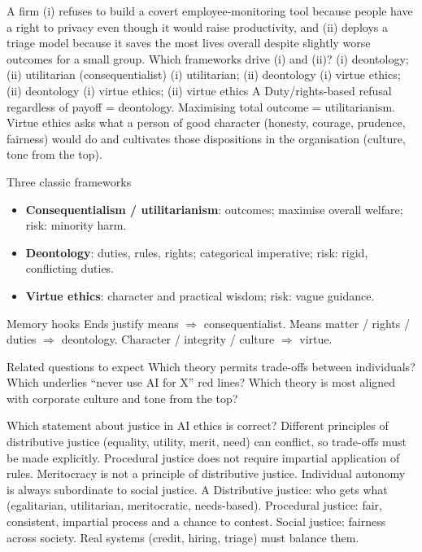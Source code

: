 {A firm (i) refuses to build a covert employee-monitoring tool because people have a right to privacy even though it would raise productivity, and (ii) deploys a triage model because it saves the most lives overall despite slightly worse outcomes for a small group. Which frameworks drive (i) and (ii)?}
{(i) deontology; (ii) utilitarian (consequentialist)}
{(i) utilitarian; (ii) deontology}
{(i) virtue ethics; (ii) deontology}
{(i) virtue ethics; (ii) virtue ethics}
{A}
{Duty/rights-based refusal regardless of payoff = deontology. Maximising total outcome = utilitarianism. Virtue ethics asks what a person of good character (honesty, courage, prudence, fairness) would do and cultivates those dispositions in the organisation (culture, tone from the top).}

{\begin{block}{Three classic frameworks}
		\begin{itemize}
			\item \textbf{Consequentialism / utilitarianism}: outcomes; maximise overall welfare; risk: minority harm.
			\item \textbf{Deontology}: duties, rules, rights; categorical imperative; risk: rigid, conflicting duties.
			\item \textbf{Virtue ethics}: character and practical wisdom; risk: vague guidance.
\end{itemize}\end{block}}
{\begin{block}{Memory hooks}
		Ends justify means $\Rightarrow$ consequentialist. Means matter / rights / duties $\Rightarrow$ deontology. Character / integrity / culture $\Rightarrow$ virtue.
	\end{block}
	\begin{alertblock}{Related questions to expect}
		Which theory permits trade-offs between individuals? Which underlies ``never use AI for X'' red lines? Which theory is most aligned with corporate culture and tone from the top?
\end{alertblock}}

{Which statement about justice in AI ethics is correct?}
{Different principles of distributive justice (equality, utility, merit, need) can conflict, so trade-offs must be made explicitly.}
{Procedural justice does not require impartial application of rules.}
{Meritocracy is not a principle of distributive justice.}
{Individual autonomy is always subordinate to social justice.}
{A}
{Distributive justice: who gets what (egalitarian, utilitarian, meritocratic, needs-based). Procedural justice: fair, consistent, impartial process and a chance to contest. Social justice: fairness across society. Real systems (credit, hiring, triage) must balance them.}

